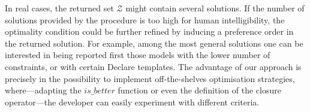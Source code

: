 %

In real cases, the returned set $\mathcal{Z}$ might contain several solutions. %
If the number of solutions provided by the procedure is too high for human intelligibility, the optimality condition could be further refined by inducing a preference order in the returned solution. For example, among the most general solutions one can be interested in being reported first those models with the lower number of constraints, or with certain Declare templates. The advantage of our approach is precisely in the possibility to implement off-the-shelves optimisation strategies, where---adapting the $is\_better$ function or even the definition of the closure operator---the developer can easily experiment with different criteria.

